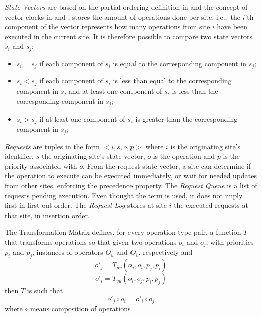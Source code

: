 \textit{State Vectors} are based on the partial ordering definition in \cite{Lamport1978} and the concept of vector clocks in \cite{Liskov1986} and \cite{Fidge1988}, stores the amount of operations done per site, i.e.,\ the $i$'th component of the vector represents how many operations from site $i$ have been executed in the current site. It is therefore possible to compare two state vectors $s_i$ and $s_j$:
\begin{itemize}
    \item $s_i = s_j$ if each component of $s_i$ is equal to the corresponding component in $s_j$;
    \item $s_i < s_j$ if each component of $s_i$ is less than equal to the corresponding component in $s_j$ and at least one component of $s_i$ is less than the corresponding component in $s_j$;
    \item $s_i > s_j$ if at least one component of $s_i$ is greater than the corresponding component in $s_j$;
\end{itemize}

\textit{Requests} are tuples in the form $<i,s,o,p>$ where $i$ is the originating site's identifier, $s$ the originating site's state vector, $o$ is the operation and $p$ is the priority associated with $o$.
From the request state vector, a site can determine if the operation to execute can be executed immediately, or wait for needed updates from other sites, enforcing the precedence property. The \textit{Request Queue} is a list of requests pending execution. Even thought the term  is used, it does not imply first-in-first-out order. The \textit{Request Log} stores at site $i$ the executed requests at that site, in insertion order.

The Transformation Matrix defines, for every operation type pair, a function $T$ that transforms operations so that given two operations $o_i$ and $o_j$, with priorities $p_i$ and $p_j$, instances of operators $O_u$ and $O_v$, respectively and
\begin{equation*}
    o'_j = T_{uv}(o_j, o_i, p_j, p_i)
\end{equation*}
\begin{equation*}
    o'_i = T_{vu}(o_i, o_j, p_i, p_j)
\end{equation*}
then $T$ is such that
\begin{equation*}
    o'_j \circ o_i = o'_i \circ o_j
\end{equation*}
where $\circ$ means composition of operations.

